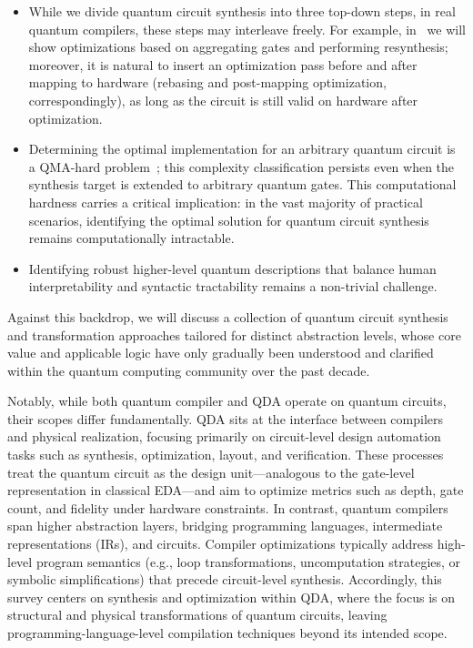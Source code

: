 \documentclass[a4paper,onecolumn,11pt,unpublished]{quantumarticle}
\begin{document}
\begin{itemize}
  \item While we divide quantum circuit synthesis into three top-down steps, in real quantum compilers, these steps may interleave freely. For example, in~ we will show optimizations based on aggregating gates and performing resynthesis; moreover, it is natural to insert an optimization pass before and after mapping to hardware (rebasing and post-mapping optimization, correspondingly), as long as the circuit is still valid on hardware after optimization.
  \item Determining the optimal implementation for an arbitrary quantum circuit is a QMA-hard problem~\cite{Janzing2005}; this complexity classification persists even when the synthesis target is extended to arbitrary quantum gates. This computational hardness carries a critical implication: in the vast majority of practical scenarios, identifying the optimal solution for quantum circuit synthesis remains computationally intractable.
  \item Identifying robust higher-level quantum descriptions that balance human interpretability and syntactic tractability remains a non-trivial challenge.
\end{itemize}


Against this backdrop, we will discuss a collection of quantum circuit synthesis and transformation approaches tailored for distinct abstraction levels, whose core value and applicable logic have only gradually been understood and clarified within the quantum computing community over the past decade.


Notably, while both quantum compiler and QDA operate on quantum circuits, their scopes differ fundamentally. QDA sits at the interface between compilers and physical realization, focusing primarily on circuit-level design automation tasks such as synthesis, optimization, layout, and verification. These processes treat the quantum circuit as the design unit---analogous to the gate-level representation in classical EDA---and aim to optimize metrics such as depth, gate count, and fidelity under hardware constraints. In contrast, quantum compilers span higher abstraction layers, bridging programming languages, intermediate representations (IRs), and circuits. Compiler optimizations typically address high-level program semantics (e.g., loop transformations, uncomputation strategies, or symbolic simplifications) that precede circuit-level synthesis. Accordingly, this survey centers on synthesis and optimization within QDA, where the focus is on structural and physical transformations of quantum circuits, leaving programming-language-level compilation techniques beyond its intended scope.
\end{document}
